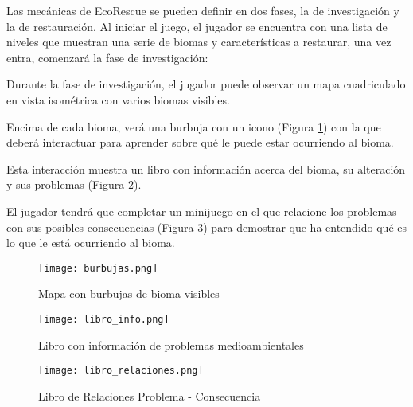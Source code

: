 Las mecánicas de EcoRescue se pueden definir en dos fases, la de investigación y la de restauración. Al iniciar el juego, el jugador se encuentra con una lista de niveles que muestran una serie de biomas y características a restaurar, una vez entra, comenzará la fase de investigación:
\begin{compactitem}
    \item Durante la fase de investigación, el jugador puede observar un mapa cuadriculado en vista isométrica con varios biomas visibles.
    \item Encima de cada bioma, verá una burbuja con un icono (Figura \ref{fig:burbujas}) con la que deberá interactuar para aprender sobre qué le puede estar ocurriendo al bioma.
    \item Esta interacción muestra un libro con información acerca del bioma, su alteración y sus problemas (Figura \ref{fig:libro}).
    \item El jugador tendrá que completar un minijuego en el que relacione los problemas con sus posibles consecuencias (Figura \ref{fig:relations}) para demostrar que ha entendido qué es lo que le está ocurriendo al bioma.
\end{compactitem}

\begin{figure}[H]
  \centering
	\texttt{[image: burbujas.png]}
  \caption{Mapa con burbujas de bioma visibles}
  \label{fig:burbujas}
\end{figure}

\begin{figure}[H]
  \centering
	\texttt{[image: libro\_info.png]}
  \caption{Libro con información de problemas medioambientales}
  \label{fig:libro}
\end{figure}

\begin{figure}[H]
  \centering
	\texttt{[image: libro\_relaciones.png]}
  \caption{Libro de Relaciones Problema - Consecuencia}
  \label{fig:relations}
\end{figure}

